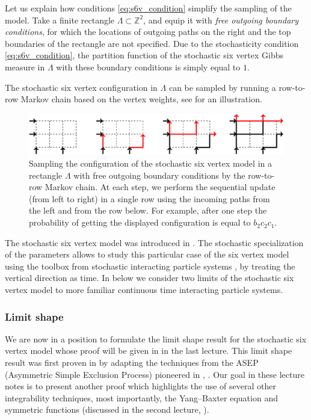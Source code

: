 \documentclass[letterpaper,11pt,oneside,reqno]{article}
\numberwithin{equation}{section}
\theoremstyle{definition}
\theoremstyle{remark}
\begin{document}
Let us explain how conditions \eqref{eq:s6v_condition}
simplify the sampling of the model.
Take a finite rectangle $\Lambda\subset\mathbb{Z}^{2}$,
and equip it with 
\emph{free outgoing boundary conditions},
for which the locations of 
outgoing paths on the right and the top boundaries of the rectangle
are not specified. 
Due to the 
stochasticity condition \eqref{eq:s6v_condition},
the partition function of the stochastic six vertex Gibbs measure 
in $\Lambda$ with these boundary conditions is simply equal to $1$.

The stochastic six vertex configuration in $\Lambda$
can be sampled by running a row-to-row Markov chain
based on the vertex weights,
see  for an illustration.


\begin{figure}[htpb]
	\centering
	\includegraphics[width=\textwidth]{./images/fig_P_u_free.pdf}
	\caption{Sampling the configuration of the stochastic six vertex model
		in a rectangle $\Lambda$ with free outgoing boundary conditions
		by the row-to-row Markov chain. At each step, 
		we perform the sequential update (from left to right)
		in a single row using 
		the incoming paths from the left and from the row below.
		For example, after one step the probability
		of getting the displayed configuration is
		equal to 
		$b_2c_2c_1$.}
	\label{fig:P_u_free}
\end{figure}

\medskip

The stochastic six vertex model was introduced in \cite{GwaSpohn1992}.
The stochastic specialization of the parameters allows to study this particular case of the 
six vertex
model using the toolbox from stochastic interacting particle systems
\cite{Liggett1985}, by treating the vertical direction as time.
In 
below we consider two limits 
of the stochastic six vertex model to 
more familiar continuous time interacting particle systems.

\subsubsection{Limit shape}
\label{subsub:limit_shape_BCG}

We are now in a position to formulate the limit shape result
for the 
stochastic six vertex model whose proof will be given in 
in the last lecture. 
This limit shape result was first proven in \cite{BCG6V}
by adapting the techniques from the ASEP (Asymmetric Simple Exclusion Process)
pioneered in
\cite{TW_ASEP1}, \cite{TW_ASEP2}. Our goal in these lecture notes is to 
present another proof which highlights the use of several other integrability techniques,
most importantly, the Yang--Baxter equation and symmetric functions (discussed in the second lecture, ).
\end{document}
